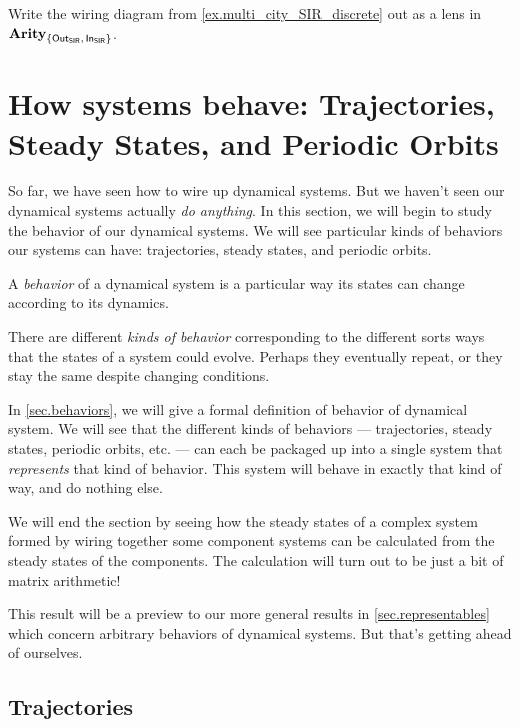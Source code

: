 \documentclass[DynamicalBook]{subfiles}
\begin{document}
\begin{exercise}

  
  Write the wiring diagram from \cref{ex.multi_city_SIR_discrete} out as a lens
  in $\textbf{Arity}_{\{\mathsf{Out}_{\mathsf{SIR}},\, \mathsf{In}_{\mathsf{SIR}} \}}$.
\end{exercise}

\section{How systems behave: Trajectories, Steady States, and Periodic Orbits}  \label{sec.trajectories_discrete}

So far, we have seen how to wire up dynamical systems. But we haven't seen our
dynamical systems actually \emph{do anything}. In this section, we will begin to
study the behavior of our dynamical systems. We will see particular kinds of
behaviors our systems can have:
trajectories, steady states, and periodic orbits.

\begin{informal}
  A \emph{behavior} of a dynamical system is a particular way its states can
  change according to its dynamics.  

  There are different \emph{kinds of behavior} corresponding to the different
  sorts ways that the states of a system could evolve. Perhaps they eventually
  repeat, or they stay the same despite changing conditions.
\end{informal}

In \cref{sec.behaviors}, we will give a formal definition of behavior of
dynamical system. We will see that the different kinds of behaviors ---
trajectories, steady states, periodic orbits, etc. --- can each
be packaged up into a single system that \emph{represents} that kind of
behavior. This system will behave in exactly that kind of way, and do nothing else.

We will end the section by seeing how the steady states of a complex system formed by wiring together some
component systems can be calculated from the steady states of the components.
The calculation will turn out to be just a bit of matrix arithmetic!

This result will be a preview to our more general results in
\cref{sec.representables} which concern arbitrary behaviors of dynamical
systems. But that's
getting ahead of ourselves.

\subsection{Trajectories}\label{sec.trajectory_discrete}
\end{document}
